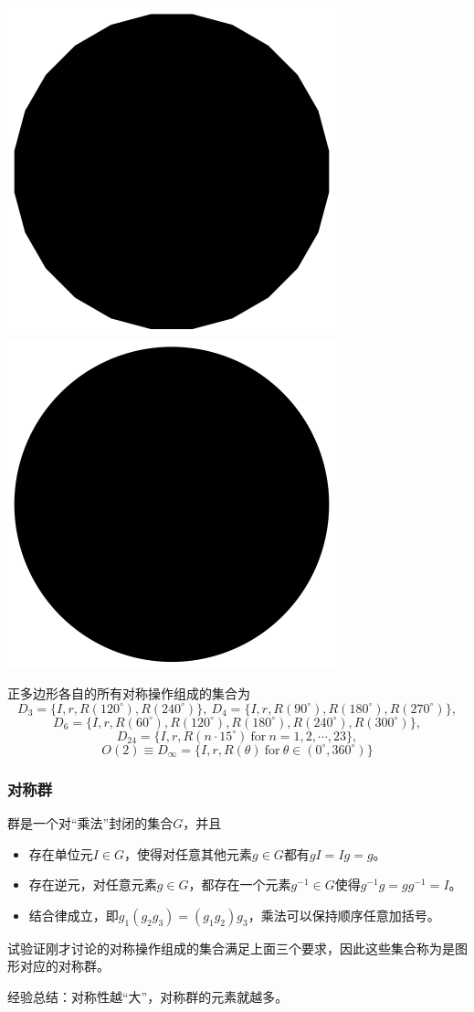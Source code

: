 \documentclass[CJK]{beamer}
\begin{document}
\begin{frame}
\begin{center}
\includegraphics[scale=0.15]{pol24}
\includegraphics[scale=0.15]{cir}
\end{center}
正多边形各自的所有对称操作组成的集合为
$$D_3 = \{I,r,R(120^\circ),R(240^\circ)\},\ D_4 = \{I,r,R(90^\circ),R(180^\circ),R(270^\circ)\},$$
$$D_6 = \{I,r,R(60^\circ),R(120^\circ),R(180^\circ),R(240^\circ),R(300^\circ)\},$$
$$D_{24} = \{I,r,R(n\cdot 15^\circ) \ \mathrm{for} \ n=1,2,\cdots,23\},$$
$$O(2) \equiv D_\infty = \{I,r,R(\theta) \ \mathrm{for} \ \theta \in (0^\circ, 360^\circ)\}$$


\ech
\end{frame}

\begin{frame}
\frametitle{\bch 对称群 \ech}
\bch
群是一个对“乘法”封闭的集合$G$，并且
\begin{itemize}
\item 存在单位元$I \in G$，使得对任意其他元素$g \in G$都有$gI = Ig = g$。
\item 存在逆元，对任意元素$g \in G$，都存在一个元素$g^{-1}\in G$使得$g^{-1} g = gg^{-1} = I$。
\item 结合律成立，即$g_1 ( g_2 g_3) = (g_1 g_2) g_3$，乘法可以保持顺序任意加括号。
\end{itemize}
试验证刚才讨论的对称操作组成的集合满足上面三个要求，因此这些集合称为是图形对应的对称群。 
\par
经验总结：对称性越“大”，对称群的元素就越多。

\ech
\end{frame}
\end{document}
